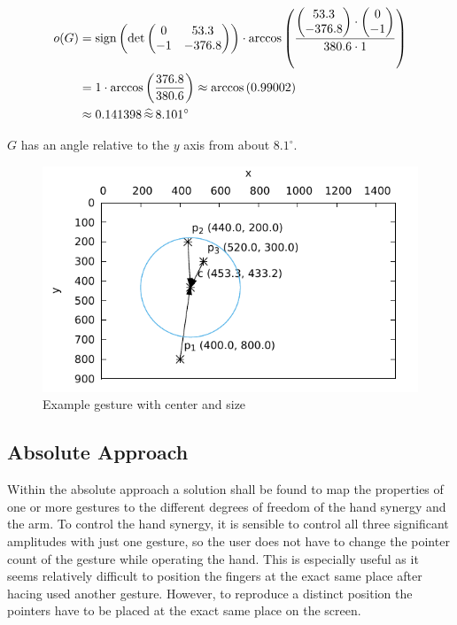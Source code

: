 \begin{align*}
o(G) &= \text{sign} \left( \det \left( \begin{matrix}
0 & 53.3 \\
-1 & -376.8
\end{matrix} \right) \right) \cdot \arccos\left( \frac{\left( \begin{matrix} 53.3 \\ -376.8 \end{matrix} \right) \cdot \left( \begin{matrix} 0 \\ -1 \end{matrix} \right)}{380.6 \cdot 1} \right) \\
&= 1 \cdot \arccos\left( \frac{376.8}{380.6} \right) 
\approx \arccos\left( 0.99002 \right) \\
&\approx 0.141398 \, \widehat{\approx} \, 8.101 ^\circ
\end{align*}

$G$ has an angle relative to the $y$ axis from about $8.1^\circ$.

\begin{figure}
	\caption{\label{fig:touch:expl_res}Example gesture with center and size}
	\begin{center}
		\includegraphics{assets/chpt_concepts/gestures/3pointers_center.pdf}
	\end{center}
	
\end{figure}

\subsection{Absolute Approach}
\label{sec:synergies:absolute}

Within the absolute approach a solution shall be found to map the properties of one or more gestures to the different degrees of freedom of the hand synergy and the arm. To control the hand synergy, it is sensible to control all three significant amplitudes with just one gesture, so the user does not have to change the pointer count of the gesture while operating the hand. This is especially useful as it seems relatively difficult to position the fingers at the exact same place after hacing used another gesture. However, to reproduce a distinct position the pointers have to be placed at the exact same place on the screen.

